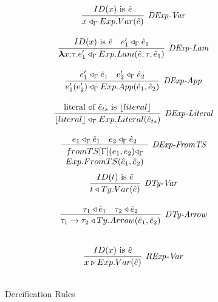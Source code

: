 \begin{figure}[t]
\centering
\begin{minipage}{.53\textwidth}
  \centering
   \[
\begin{array}{c}

\infer[\textit{DExp-Var}]
	{ x \triangleleft_{\Gamma} Exp.Var(\hat{e})   }
	{ ID(x)\ \text{is}\ \hat{e}} \\[3ex]

\infer[\textit{DExp-Lam}]
	{ \boldsymbol\lambda x{:}\tau . e'_1 \triangleleft_{\Gamma} Exp.Lam( \hat{e}, \tau, \hat{e}_1 )  }
	{ID(x)\ \text{is}\ \hat{e} & e'_1 \triangleleft_{\Gamma} \hat{e}_1  } \\[3ex]

\infer[\textit{DExp-App}]
	{ e'_1(e'_2)  \triangleleft_{\Gamma} Exp.App(\hat{e}_1,\hat{e}_2) }
	{ e'_1 \triangleleft_{\Gamma} \hat{e}_1  & e'_2 \triangleleft_{\Gamma} \hat{e}_2   } \\[3ex]

\infer[\textit{DExp-Literal}]
	{ \lfloor literal \rfloor \triangleleft_{\Gamma} Exp.Literal( \hat{e}_{ts} )  }
	{ \text{literal of}\ \hat{e}_{ts}\ \text{is}\ \lfloor literal \rfloor  } \\[3ex]

\infer[\textit{DExp-FromTS}]
          {\renewcommand{\arraystretch}{1}
	    \begin{array}{r}
	    fromTS[\Gamma](e_1,e_2) \triangleleft_{\Gamma}\\
            Exp.FromTS(\hat{e}_1,\hat{e}_2)
            \end{array}
       }
	  {e_1 \triangleleft_{\Gamma} \hat{e}_1 & e_2 \triangleleft_{\Gamma} \hat{e}_2  }
	   \\[3ex] 

\infer[\textit{DTy-Var}]
	{ t \triangleleft Ty.Var(\hat{e})   }
	{ ID(t)\ \text{is}\ \hat{e}} \\[3ex]

\infer[\textit{DTy-Arrow}]
	{ \tau_1 \rightarrow \tau_2 \triangleleft Ty.Arrow(\hat{e}_1,\hat{e}_2 )  }
	{ \tau_1 \triangleleft \hat{e}_1 & \tau_2 \triangleleft \hat{e}_2 } \\[3ex]
   
\end{array}
\]
\label{fig:dereification}
\caption{Dereification Rules}
\end{minipage}%
\vline
\begin{minipage}{.47\textwidth}
  \centering
  \[
\begin{array}{c}
\infer[\textit{RExp-Var}]
	{ x \triangleright Exp.Var(\hat{e})   }
	{ ID(x)\ \text{is}\ \hat{e}} \\[3ex]


\end{array}\]
\end{minipage}
\end{figure}
